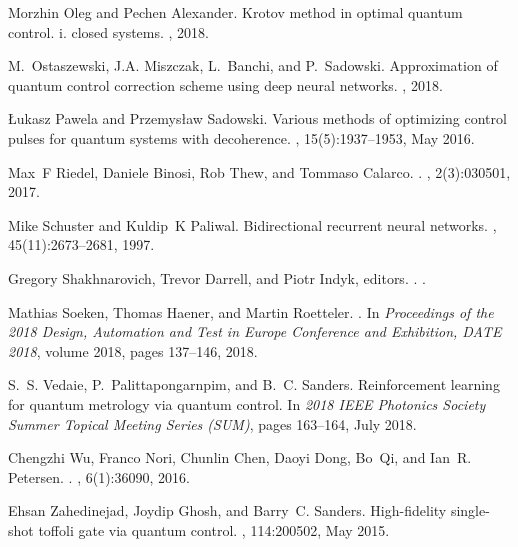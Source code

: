 \documentclass[aps,pra,showkeys,showpacs,notitlepage,superscriptaddress]{revtex4-1}
\newcommand{\1}{{\rm 1\hspace{-0.9mm}l}}
\begin{document}
\begin{thebibliography}{10}
  Morzhin Oleg and Pechen Alexander.
  \newblock Krotov method in optimal quantum control. i. closed systems.
  , 2018.
  
  M.~Ostaszewski, J.A. Miszczak, L.~Banchi, and P.~Sadowski.
  \newblock Approximation of quantum control correction scheme using deep neural
  networks.
  , 2018.
  
  {\L}ukasz Pawela and Przemys{\l}aw Sadowski.
  \newblock Various methods of optimizing control pulses for quantum systems with
  decoherence.
  , 15(5):1937--1953, May 2016.
  
  Max~F Riedel, Daniele Binosi, Rob Thew, and Tommaso Calarco.
  .
  , 2(3):030501, 2017.
  
  Mike Schuster and Kuldip~K Paliwal.
  \newblock Bidirectional recurrent neural networks.
  , 45(11):2673--2681,
  1997.
  
  Gregory Shakhnarovich, Trevor Darrell, and Piotr Indyk, editors.
  .
  .
  
  Mathias Soeken, Thomas Haener, and Martin Roetteler.
  .
  \newblock In {\em Proceedings of the 2018 Design, Automation and Test in Europe
    Conference and Exhibition, DATE 2018}, volume 2018, pages 137--146, 2018.
  
  S.~S. {Vedaie}, P.~{Palittapongarnpim}, and B.~C. {Sanders}.
  \newblock Reinforcement learning for quantum metrology via quantum control.
  \newblock In {\em 2018 IEEE Photonics Society Summer Topical Meeting Series
    (SUM)}, pages 163--164, July 2018.
  
  Chengzhi Wu, Franco Nori, Chunlin Chen, Daoyi Dong, Bo~Qi, and Ian~R. Petersen.
  .
  , 6(1):36090, 2016.
  
  Ehsan Zahedinejad, Joydip Ghosh, and Barry~C. Sanders.
  \newblock High-fidelity single-shot toffoli gate via quantum control.
  , 114:200502, May 2015.
  
\end{thebibliography}
\end{document}
